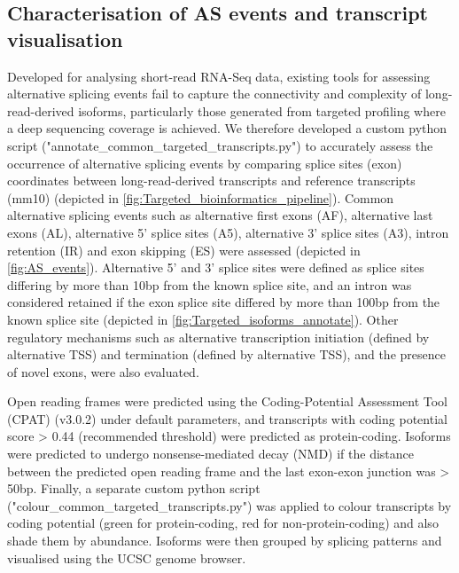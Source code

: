 \newpage
\subsection{Characterisation of AS events and transcript visualisation}
\label{ch6: methods_characterisation}
Developed for analysing short-read RNA-Seq data, existing tools for assessing alternative splicing events fail to capture the connectivity and complexity of long-read-derived isoforms, particularly those generated from targeted profiling where a deep sequencing coverage is achieved. We therefore developed a custom python script ("annotate\_common\_targeted\_transcripts.py") to accurately assess the occurrence of alternative splicing events by comparing splice sites (exon) coordinates between long-read-derived transcripts and reference transcripts (mm10) (depicted in \cref{fig:Targeted_bioinformatics_pipeline}). Common alternative splicing events such as alternative first exons (AF), alternative last exons (AL), alternative 5' splice sites (A5), alternative 3' splice sites (A3), intron retention (IR) and exon skipping (ES) were assessed (depicted in \cref{fig:AS_events}). Alternative 5' and 3' splice sites were defined as splice sites differing by more than 10bp from the known splice site, and an intron was considered retained if the exon splice site differed by more than 100bp from the known splice site (depicted in \cref{fig:Targeted_isoforms_annotate}). Other regulatory mechanisms such as alternative transcription initiation (defined by alternative TSS) and termination (defined by alternative TSS), and the presence of novel exons, were also evaluated. 

Open reading frames were predicted using the Coding-Potential Assessment Tool\cite{Wang2013b} (CPAT) (v3.0.2) under default parameters, and transcripts with coding potential score > 0.44 (recommended threshold) were predicted as protein-coding. Isoforms were predicted to undergo nonsense-mediated decay (NMD) if the distance between the predicted open reading frame and the last exon-exon junction was > 50bp. Finally, a separate custom python script ("colour\_common\_targeted\_transcripts.py") was applied to colour transcripts by coding potential (green for protein-coding, red for non-protein-coding) and also shade them by abundance. Isoforms were then grouped by splicing patterns and visualised using the UCSC genome browser. 

